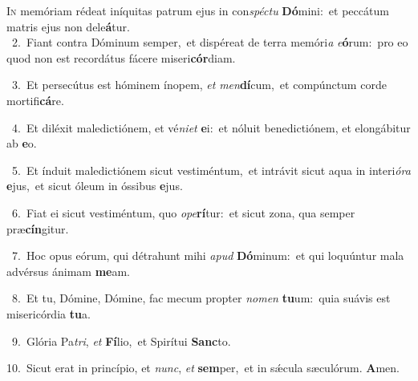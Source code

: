 \lettrine{\initial\textcolor{\initialcolor}{I}}{n} memóriam rédeat iníquitas patrum ejus in con\-\textit{spéc}\-\textit{tu} \textbf{Dó}\-mini:~\star et peccátum matris ejus non dele\-\textbf{á}\-tur.\\
{\numbfont\textcolor{\numbcolor}{~2.}}~Fiant contra Dóminum semper,~\dagger et dispéreat de terra memóri\textit{a} \textit{e}\-\textbf{ó}rum:~\star pro eo quod non est recordátus fácere miseri\-\textbf{cór}\-diam.\par
{\numbfont\textcolor{\numbcolor}{~3.}}~Et persecútus est hóminem ínopem, \textit{et} \textit{men}\-\textbf{dí}cum,~\star et compúnctum corde mortifi\-\textbf{cá}\-re.\par
{\numbfont\textcolor{\numbcolor}{~4.}}~Et diléxit maledictiónem, et vé\-\textit{ni}\-\textit{et} \textbf{e}\-i:~\star et nóluit benedictiónem, et elongábitur ab \textbf{e}\-o.\par
{\numbfont\textcolor{\numbcolor}{~5.}}~Et índuit maledictiónem sicut vestiméntum,~\dagger et intrávit sicut aqua in interi\-\textit{ó}\-\textit{ra} \textbf{e}\-jus,~\star et sicut óleum in óssibus \textbf{e}\-jus.\par
{\numbfont\textcolor{\numbcolor}{~6.}}~Fiat ei sicut vestiméntum, quo \textit{o}\-\textit{pe}\textbf{rí}tur:~\star et sicut zona, qua semper præ\-\textbf{cín}\-gitur.\par
{\numbfont\textcolor{\numbcolor}{~7.}}~Hoc opus eórum, qui détrahunt mihi \textit{a}\-\textit{pud} \textbf{Dó}\-minum:~\star et qui loquúntur mala advérsus ánimam \textbf{me}\-am.\par
{\numbfont\textcolor{\numbcolor}{~8.}}~Et tu, Dómine, Dómine, fac mecum propter \textit{no}\-\textit{men} \textbf{tu}\-um:~\star quia suávis est misericórdia \textbf{tu}\-a.\par
{\numbfont\textcolor{\numbcolor}{~9.}}~Glória Pa\-\textit{tri}\-, \textit{et} \textbf{Fí}\-lio,~\star et Spirítui \textbf{Sanc}\-to.\par
{\numbfont\textcolor{\numbcolor}{10.}}~Sicut erat in princípio, et \textit{nunc}\-, \textit{et} \textbf{sem}\-per,~\star et in sǽcula sæculórum. \textbf{A}\-men.\par
